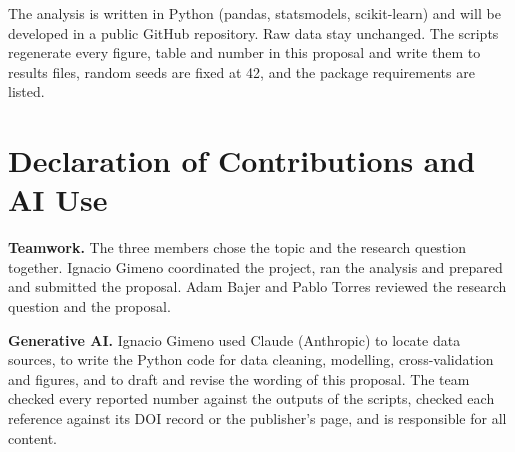 \documentclass[clean]{bam-proposal}
\begin{document}
The analysis is written in Python (pandas, statsmodels, scikit-learn) and will be developed in a public GitHub repository. Raw data stay unchanged. The scripts regenerate every figure, table and number in this proposal and write them to results files, random seeds are fixed at 42, and the package requirements are listed.

\BAMprintbibliography

\section*{Declaration of Contributions and AI Use}

\textbf{Teamwork.} The three members chose the topic and the research question together. Ignacio Gimeno coordinated the project, ran the analysis and prepared and submitted the proposal. Adam Bajer and Pablo Torres reviewed the research question and the proposal.

\textbf{Generative AI.} Ignacio Gimeno used Claude (Anthropic) to locate data sources, to write the Python code for data cleaning, modelling, cross-validation and figures, and to draft and revise the wording of this proposal. The team checked every reported number against the outputs of the scripts, checked each reference against its DOI record or the publisher's page, and is responsible for all content.
\end{document}
